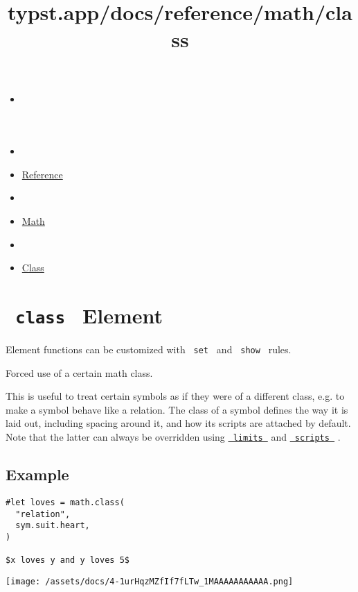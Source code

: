 \title{typst.app/docs/reference/math/class}

\begin{itemize}
\tightlist
\item
  \href{/docs}{}
\item
  
\item
  \href{/docs/reference/}{Reference}
\item
  
\item
  \href{/docs/reference/math/}{Math}
\item
  
\item
  \href{/docs/reference/math/class/}{Class}
\end{itemize}

\section{\texorpdfstring{\texttt{\ class\ } {{ Element
}}}{ class   Element }}\label{summary}

\label{element-tooltip}
Element functions can be customized with \texttt{\ set\ } and
\texttt{\ show\ } rules.

Forced use of a certain math class.

This is useful to treat certain symbols as if they were of a different
class, e.g. to make a symbol behave like a relation. The class of a
symbol defines the way it is laid out, including spacing around it, and
how its scripts are attached by default. Note that the latter can always
be overridden using
\href{/docs/reference/math/attach/\#functions-limits}{\texttt{\ limits\ }}
and
\href{/docs/reference/math/attach/\#functions-scripts}{\texttt{\ scripts\ }}
.

\subsection{Example}\label{example}

\begin{verbatim}
#let loves = math.class(
  "relation",
  sym.suit.heart,
)

$x loves y and y loves 5$
\end{verbatim}

\texttt{[image: /assets/docs/4-1urHqzMZfIf7fLTw\_1MAAAAAAAAAAA.png]}

